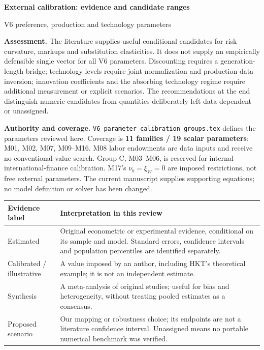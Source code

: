 \documentclass[10pt,a4paper,landscape]{article}
\newcommand{\code}[1]{{\small\texttt{#1}}}
\begin{document}
{\LARGE\sffamily\bfseries\color{heading}External calibration: evidence and candidate ranges}\par
{\large\sffamily V6 preference, production and technology parameters}\par

\textbf{Assessment.} The literature supplies useful conditional candidates for risk curvature,
markups and substitution elasticities. It does not supply an empirically defensible single
vector for all V6 parameters. Discounting requires a generation-length bridge; technology
levels require joint normalization and production-data inversion; innovation coefficients
and the absorbing technology regime require additional measurement or explicit scenarios.
The recommendations at the end distinguish numeric candidates from
quantities deliberately left data-dependent or unassigned.

\textbf{Authority and coverage.}
\code{V6\_parameter\_calibration\_groups.tex} defines the parameters reviewed here.
Coverage is \textbf{11 families / 19 scalar parameters}: M01, M02, M07, M09--M16.
M08 labor endowments are data inputs and receive no conventional-value search.
Group C, M03--M06, is reserved for internal international-finance calibration.
M17's $\nu_b=\xi_W=0$ are imposed restrictions, not free external parameters.
The current manuscript supplies supporting equations; no model definition or solver has been changed.

\begin{center}\small
\begin{tabular}{@{}P{.20\textwidth}P{.73\textwidth}@{}}
\toprule{}\textbf{Evidence label} & \textbf{Interpretation in this review}\\\midrule
Estimated & Original econometric or experimental evidence, conditional on its sample and model. Standard errors, confidence intervals and population percentiles are identified separately.\\[3pt]
Calibrated / illustrative & A value imposed by an author, including HKT's theoretical example; it is not an independent estimate.\\[3pt]
Synthesis & A meta-analysis of original studies; useful for bias and heterogeneity, without treating pooled estimates as a consensus.\\[3pt]
Proposed scenario & Our mapping or robustness choice; its endpoints are not a literature confidence interval. Unassigned means no portable numerical benchmark was verified.\\
\bottomrule
\end{tabular}
\end{center}
\end{document}
